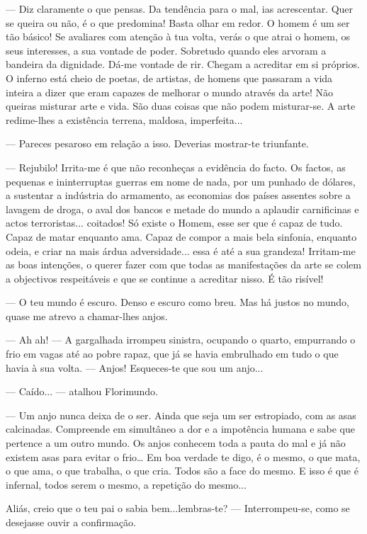 --- Diz claramente o que pensas. Da tendência para o mal, ias acrescentar.
Quer se queira ou não, é o que predomina! Basta olhar em redor. O homem
é um ser tão básico! Se avaliares com atenção à tua volta, verás o que
atrai o homem, os seus interesses, a sua vontade de poder. Sobretudo
quando eles arvoram a bandeira da dignidade. Dá-me vontade de rir.
Chegam a acreditar em si próprios. O inferno está cheio de poetas, de
artistas, de homens que passaram a vida inteira a dizer que eram capazes
de melhorar o mundo através da arte! Não queiras misturar arte e vida.
São duas coisas que não podem misturar-se. A arte redime-lhes a
existência terrena, maldosa, imperfeita...

--- Pareces pesaroso em relação a isso. Deverias mostrar-te triunfante.

--- Rejubilo! Irrita-me é que não reconheças a evidência do facto. Os
factos, as pequenas e ininterruptas guerras em nome de nada, por um
punhado de dólares, a sustentar a indústria do armamento, as economias
dos países assentes sobre a lavagem de droga, o aval dos bancos e metade
do mundo a aplaudir carnificinas e actos terroristas... coitados! Só
existe o Homem, esse ser que é capaz de tudo. Capaz de matar enquanto
ama. Capaz de compor a mais bela sinfonia, enquanto odeia, e criar na
mais árdua adversidade... essa é até a sua grandeza! Irritam-me as boas
intenções, o querer fazer com que todas as manifestações da arte se
colem a objectivos respeitáveis e que se continue a acreditar nisso. É
tão risível!

--- O teu mundo é escuro. Denso e escuro como breu. Mas há justos no
mundo, quase me atrevo a chamar-lhes anjos.

--- Ah ah! --- A gargalhada irrompeu sinistra, ocupando o quarto, empurrando
o frio em vagas até ao pobre rapaz, que já se havia embrulhado em tudo o
que havia à sua volta. --- Anjos! Esqueces-te que sou um anjo...

--- Caído... --- atalhou Florimundo.

--- Um anjo nunca deixa de o ser. Ainda que seja um ser estropiado, com as
asas calcinadas. Compreende em simultâneo a dor e a impotência humana e
sabe que pertence a um outro mundo. Os anjos conhecem toda a pauta do
mal e já não existem asas para evitar o frio\ldots{} Em boa verdade te
digo, é o mesmo, o que mata, o que ama, o que trabalha, o que cria.
Todos são a face do mesmo. E isso é que é infernal, todos serem o mesmo,
a repetição do mesmo...

Aliás, creio que o teu pai o sabia bem...lembras-te? --- Interrompeu-se,
como se desejasse ouvir a confirmação.

